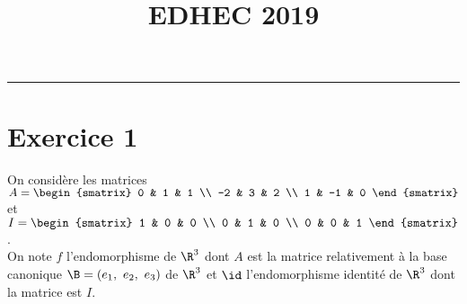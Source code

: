 \documentclass[11pt]{article}%
\title{\bf \vspace{-1.6cm} EDHEC 2019} %
\author{} %
\date{} %
\begin{document}
\maketitle %
\vspace{-1.2cm}\hrule %
\thispagestyle{fancy}

\vspace*{.4cm}


\section*{Exercice 1}

\noindent
On considère les matrices $A =
\begin{smatrix}
  0 & 1 & 1 \\
  -2 & 3 & 2 \\
  1 & -1 & 0
\end{smatrix}
$ et $I =
\begin{smatrix}
  1 & 0 & 0 \\
  0 & 1 & 0 \\
  0 & 0 & 1
\end{smatrix}
$.\\
On note $f$ l'endomorphisme de $\R^3$ dont $A$ est la matrice
relativement à la base canonique $\B = (e_1, \ e_2, \ e_3)$ de $\R^3$
et $\id$ l'endomorphisme identité de $\R^3$ dont la matrice est $I$.
\end{document}
